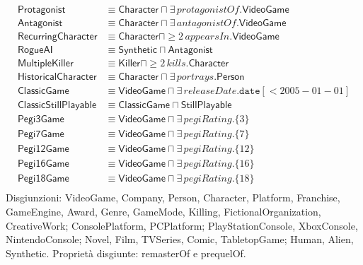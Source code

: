 \begin{align*}
\textsf{Protagonist} &\equiv \textsf{Character} \sqcap \exists\,\textit{protagonistOf}.\textsf{VideoGame} \\
\textsf{Antagonist} &\equiv \textsf{Character} \sqcap \exists\,\textit{antagonistOf}.\textsf{VideoGame} \\
\textsf{RecurringCharacter} &\equiv \textsf{Character} \sqcap {\geq}2\,\textit{appearsIn}.\textsf{VideoGame} \\
\textsf{RogueAI} &\equiv \textsf{Synthetic} \sqcap \textsf{Antagonist} \\
\textsf{MultipleKiller} &\equiv \textsf{Killer} \sqcap {\geq}2\,\textit{kills}.\textsf{Character} \\
\textsf{HistoricalCharacter} &\equiv \textsf{Character} \sqcap \exists\,\textit{portrays}.\textsf{Person} \\
\textsf{ClassicGame} &\equiv \textsf{VideoGame} \sqcap \exists\,\textit{releaseDate}.\texttt{date}[< 2005-01-01] \\
\textsf{ClassicStillPlayable} &\equiv \textsf{ClassicGame} \sqcap \textsf{StillPlayable} \\
\textsf{Pegi3Game} &\equiv \textsf{VideoGame} \sqcap \exists\,\textit{pegiRating}.\{3\} \\
\textsf{Pegi7Game} &\equiv \textsf{VideoGame} \sqcap \exists\,\textit{pegiRating}.\{7\} \\
\textsf{Pegi12Game} &\equiv \textsf{VideoGame} \sqcap \exists\,\textit{pegiRating}.\{12\} \\
\textsf{Pegi16Game} &\equiv \textsf{VideoGame} \sqcap \exists\,\textit{pegiRating}.\{16\} \\
\textsf{Pegi18Game} &\equiv \textsf{VideoGame} \sqcap \exists\,\textit{pegiRating}.\{18\} \\
\end{align*}\endgroup
\noindent Disgiunzioni: VideoGame, Company, Person, Character, Platform, Franchise, GameEngine, Award, Genre, GameMode, Killing, FictionalOrganization, CreativeWork; ConsolePlatform, PCPlatform; PlayStationConsole, XboxConsole, NintendoConsole; Novel, Film, TVSeries, Comic, TabletopGame; Human, Alien, Synthetic. Proprietà disgiunte: remasterOf e prequelOf.

